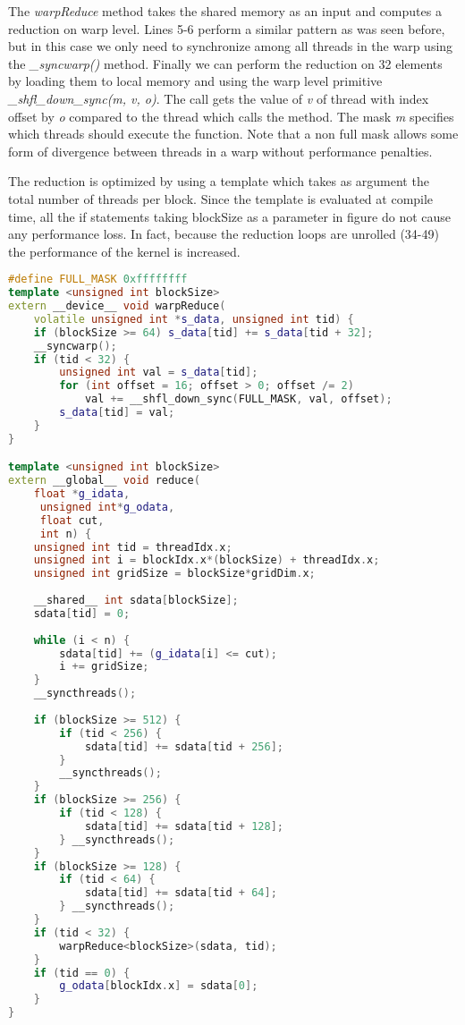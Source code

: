 \documentclass[]{article}
\begin{document}
The \textit{warpReduce} method takes the shared memory as an input and computes a reduction on warp level. Lines 5-6 perform a similar pattern as was seen before, but in this case we only need to synchronize among all threads in the warp using the \textit{\_syncwarp()} method. Finally we can perform the reduction on 32 elements by loading them to local memory and using the warp level primitive \textit{\_shfl\_down\_sync(m, v, o)}. The call gets the value of \textit{v} of thread with index offset by \textit{o} compared to the thread which calls the method. The mask \textit{m} specifies which threads should execute the function. Note that a non full mask allows some form of divergence between threads in a warp without performance penalties. \cite{warps}

The reduction is optimized by using a template which takes as argument the total number of threads per block. Since the template is evaluated at compile time, all the if statements taking blockSize as a parameter in figure do not cause any performance loss. In fact, because  the reduction loops are unrolled (34-49) the performance of the kernel is increased. \cite{reduction}

\begin{lstlisting}[language=c++, caption=Conditional Reduction in CUDA, label=cuda:reduction]
#define FULL_MASK 0xffffffff
template <unsigned int blockSize>
extern __device__ void warpReduce(
	volatile unsigned int *s_data, unsigned int tid) {
    if (blockSize >= 64) s_data[tid] += s_data[tid + 32];
	__syncwarp();
	if (tid < 32) {
		unsigned int val = s_data[tid];
		for (int offset = 16; offset > 0; offset /= 2)
			val += __shfl_down_sync(FULL_MASK, val, offset);
		s_data[tid] = val;
	}
}

template <unsigned int blockSize>
extern __global__ void reduce(
	float *g_idata,
	 unsigned int*g_odata, 
	 float cut, 
	 int n) {
	unsigned int tid = threadIdx.x;
	unsigned int i = blockIdx.x*(blockSize) + threadIdx.x;
	unsigned int gridSize = blockSize*gridDim.x;
	
	__shared__ int sdata[blockSize];
	sdata[tid] = 0;
	
	while (i < n) {
		sdata[tid] += (g_idata[i] <= cut);
		i += gridSize;
	}
	__syncthreads();
	
	if (blockSize >= 512) {
		if (tid < 256) {
			sdata[tid] += sdata[tid + 256];
		}
		__syncthreads();
	}
	if (blockSize >= 256) {
		if (tid < 128) {
			sdata[tid] += sdata[tid + 128];
		} __syncthreads();
	}
	if (blockSize >= 128) {
		if (tid < 64) {
			sdata[tid] += sdata[tid + 64];
		} __syncthreads();
	}
	if (tid < 32) {
		warpReduce<blockSize>(sdata, tid);
	}
	if (tid == 0) {
		g_odata[blockIdx.x] = sdata[0];
	}
}
\end{lstlisting}
\end{document}
